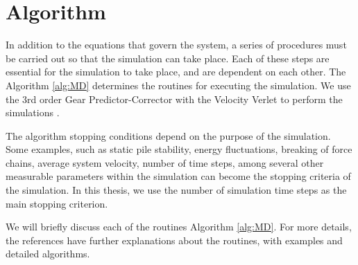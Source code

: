 \section{Algorithm}
    In addition to the equations that govern the system, a series of procedures must be carried out so that the simulation can take place. Each of these steps are essential for the simulation to take place, and are dependent on each other. The Algorithm \ref{alg:MD} determines the routines for executing the simulation. We use the 3rd order Gear Predictor-Corrector with the Velocity Verlet to perform the simulations \cite{Computer_Simulation_of_Liquids}.




    The algorithm stopping conditions depend on the purpose of the simulation. Some examples, such as static pile stability, energy fluctuations, breaking of force chains, average system velocity, number of time steps, among several other measurable parameters within the simulation can become the stopping criteria of the simulation. In this thesis, we use the number of simulation time steps as the main stopping criterion. 


    We will briefly discuss each of the routines Algorithm \ref{alg:MD}. For more details, the references \cite{Dissertacao, Computer_Simulation_of_Liquids, Computational_Granular_Dynamics} have further explanations about the routines, with examples and detailed algorithms. 

